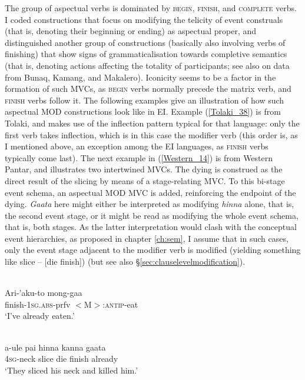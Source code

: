 The group of aspectual verbs is dominated by \textsc{begin}, \textsc{finish}, and \textsc{complete} verbs. I coded constructions that focus on modifying the telicity of event construals (that is, denoting their beginning or ending) as aspectual proper, and distinguished another group of constructions (basically also involving verbs of finishing) that show signs of grammaticalisation towards completive semantics (that is, denoting actions affecting the totality of participants; see also \citealt{huber2014} on data from Bunaq, Kamang, and Makalero). Iconicity seems to be a factor in the formation of such MVCs, as \textsc{begin} verbs normally precede the matrix verb, and \textsc{finish} verbs follow it. The following examples give an illustration of how such aspectual MOD constructions look like in EI. Example (\ref{Tolaki_38}) is from Tolaki, and makes use of the inflection pattern typical for that language: only the first verb takes inflection, which is in this case the modifier verb (this order is, as I mentioned above, an exception among the EI  languages, as \textsc{finish} verbs typically come last). The next example in (\ref{Western_14}) is from Western Pantar, and illustrates two intertwined MVCs. The dying is construed as the direct result of the slicing by means of a stage-relating MVC. To this bi-stage event schema, an aspectual MOD MVC is added, reinforcing the endpoint of the dying. \textit{Gaata} here might either be interpreted as modifying \textit{hinna} alone, that is, the second event stage, or it might be read as modifying the whole event schema, that is, both stages. As the latter interpretation would clash with the conceptual event hierarchies, as proposed in chapter \ref{ch:sem}, I assume that in such cases, only the event stage adjacent to the modifier verb is modified (yielding something like slice -- [die finish]) (but see also §\ref{sec:clauselevelmodification}).

\ea \label{Tolaki_38}
\\
\gll Ari-'aku-to mong-gaa\\
finish-1\textsc{sg}.\textsc{abs}-prfv $<$M$>$:\textsc{antip}-eat \\
\glft `I've already eaten.'\\ 
\z

\ea \label{Western_14}
\\
\gll a-ule pai hinna kanna gaata \\
4\textsc{sg}-neck slice die finish already \\
\glft `They sliced his neck and killed him.'\\ 
\z

